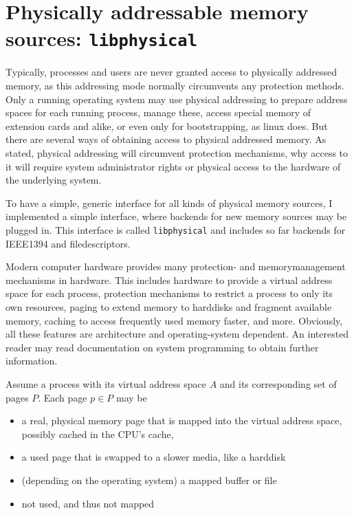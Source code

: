 %
%

\section{Physically addressable memory sources: \texttt{libphysical}}

Typically, processes and users are never granted access to physically addressed
memory, as this addressing mode normally circumvents any protection methods.
Only a running operating system may use physical addressing to prepare address
spaces for each running process, manage these, access special memory of
extension cards and alike, or even only for bootstrapping, as linux does. But
there are several ways of obtaining access to physical addressed memory. As
stated, physical addressing will circumvent protection mechanisms, why access to
it will require system administrator rights or physical access to the hardware
of the underlying system.

To have a simple, generic interface for all kinds of physical memory sources, I
implemented a simple interface, where backends for new memory sources may be
plugged in. This interface is called \texttt{libphysical} and includes so far
backends for IEEE1394 and filedescriptors.

Modern computer hardware provides many protection- and memorymanagement
mechanisms in hardware. This includes hardware to provide a virtual address
space for each process, protection mechanisms to restrict a process to only its
own resources, paging to extend memory to harddisks and fragment available
memory, caching to access frequently used memory faster, and more. Obviously,
all these features are architecture and operating-system dependent. An
interested reader may read documentation on system programming to obtain further
information.

Assume a process with its virtual address space $A$ and its corresponding set of
pages $P$. Each page $p \in P$ may be

\begin{itemize}

	\item a real, physical memory page that is mapped into the virtual 
		address space, possibly cached in the CPU's cache,

	\item a used page that is swapped to a slower media, like a harddisk

	\item (depending on the operating system) a mapped buffer or file

	\item not used, and thus not mapped

\end{itemize}

